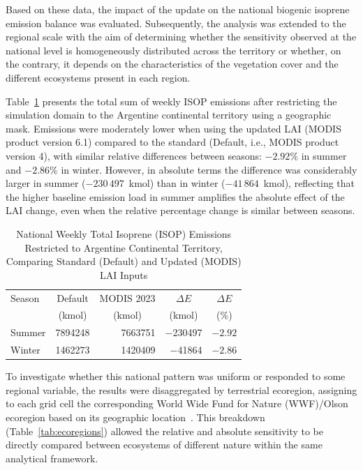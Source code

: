 \documentclass[conference,a4paper]{IEEEtran}   %
\begin{document}
Based on these data, the impact of the update on the national biogenic isoprene emission balance was evaluated. Subsequently, the analysis was extended to the regional scale with the aim of determining whether the sensitivity observed at the national level is homogeneously distributed across the territory or whether, on the contrary, it depends on the characteristics of the vegetation cover and the different ecosystems present in each region.

Table~\ref{tab:national} presents the total sum of weekly ISOP emissions after restricting the simulation domain to the Argentine continental territory using a geographic mask. Emissions were moderately lower when using the updated LAI (MODIS product version 6.1) compared to the standard (Default, i.e., MODIS product version 4), with similar relative differences between seasons: $-2.92\%$ in summer and $-2.86\%$ in winter. However, in absolute terms the difference was considerably larger in summer ($-230\,497$~kmol) than in winter ($-41\,864$~kmol), reflecting that the higher baseline emission load in summer amplifies the absolute effect of the LAI change, even when the relative percentage change is similar between seasons.

\begin{table}[!t]
\centering
\caption{National Weekly Total Isoprene (ISOP) Emissions Restricted to Argentine Continental Territory, Comparing Standard (Default) and Updated (MODIS) LAI Inputs}
\label{tab:national}
\begin{tabular}{@{}lrrrr@{}}
\toprule
Season & \multicolumn{1}{c}{Default} & \multicolumn{1}{c}{MODIS 2023} & \multicolumn{1}{c}{$\Delta E$} & \multicolumn{1}{c}{$\Delta E$} \\
       & \multicolumn{1}{c}{(kmol)} & \multicolumn{1}{c}{(kmol)} & \multicolumn{1}{c}{(kmol)} & \multicolumn{1}{c}{(\%)} \\
\midrule
Summer & \num{7894248} & \num{7663751} & \num{-230497} & $-2.92$ \\
Winter & \num{1462273} & \num{1420409} & \num{-41864}  & $-2.86$ \\
\bottomrule
\end{tabular}
\end{table}

To investigate whether this national pattern was uniform or responded to some regional variable, the results were disaggregated by terrestrial ecoregion, assigning to each grid cell the corresponding World Wide Fund for Nature (WWF)/Olson ecoregion based on its geographic location~\cite{olson2001,dinerstein2017}. This breakdown (Table~\ref{tab:ecoregions}) allowed the relative and absolute sensitivity to be directly compared between ecosystems of different nature within the same analytical framework.
\end{document}
